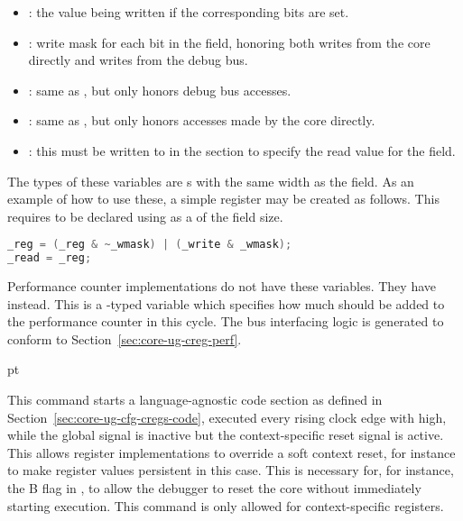 \begin{itemize}

\item {}: the value being written if the corresponding 
bits are set.

\item {}: write mask for each bit in the field, honoring both writes
from the core directly and writes from the debug bus.

\item {}: same as , but only honors debug bus
accesses.

\item {}: same as , but only honors accesses made
by the core directly.

\item {}: this must be written to in the \code{\implementation{}}
section to specify the read value for the field.

\end{itemize}

\noindent The types of these variables are s with the same width as 
the field. As an example of how to use these, a simple register may be created 
as follows. This requires  to be declared using \code{\declRegister} 
as a  of the field size.

\begin{lstlisting}[numbers=none, language=C]
_reg = (_reg & ~_wmask) | (_write & _wmask);
_read = _reg;
\end{lstlisting}

\noindent Performance counter implementations do not have these variables. They
have  instead. This is a -typed variable which specifies
how much should be added to the performance counter in this cycle. The bus
interfacing logic is generated to conform to Section~\ref{sec:core-ug-creg-perf}.

 pt
\codehead{\resetImplementation{}}

\noindent This command starts a language-agnostic code section as defined in 
Section~\ref{sec:core-ug-cfg-cregs-code}, executed every rising clock edge with 
 high, while the global  signal is inactive but the 
context-specific reset signal is active. This allows register implementations to 
override a soft context reset, for instance to make register values persistent 
in this case. This is necessary for, for instance, the B flag in , to 
allow the debugger to reset the core without immediately starting execution. 
This command is only allowed for context-specific registers.

